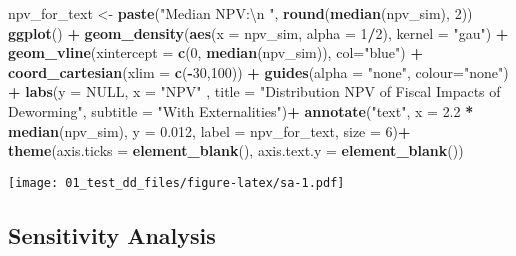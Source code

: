 \documentclass[]{article}
\newenvironment{Shaded}{\begin{snugshade}}{\end{snugshade}}
\newcommand{\CharTok}[1]{\textcolor[rgb]{0.31,0.60,0.02}{#1}}
\newcommand{\DataTypeTok}[1]{\textcolor[rgb]{0.13,0.29,0.53}{#1}}
\newcommand{\DecValTok}[1]{\textcolor[rgb]{0.00,0.00,0.81}{#1}}
\newcommand{\FloatTok}[1]{\textcolor[rgb]{0.00,0.00,0.81}{#1}}
\newcommand{\KeywordTok}[1]{\textcolor[rgb]{0.13,0.29,0.53}{\textbf{#1}}}
\newcommand{\NormalTok}[1]{#1}
\newcommand{\OperatorTok}[1]{\textcolor[rgb]{0.81,0.36,0.00}{\textbf{#1}}}
\newcommand{\OtherTok}[1]{\textcolor[rgb]{0.56,0.35,0.01}{#1}}
\newcommand{\StringTok}[1]{\textcolor[rgb]{0.31,0.60,0.02}{#1}}
\begin{document}
\begin{Shaded}
\begin{Highlighting}[]
\NormalTok{npv_for_text <-}\StringTok{ }\KeywordTok{paste}\NormalTok{(}\StringTok{"Median NPV:}\CharTok{\textbackslash{}n}\StringTok{ "}\NormalTok{, }\KeywordTok{round}\NormalTok{(}\KeywordTok{median}\NormalTok{(npv_sim), }\DecValTok{2}\NormalTok{))}
\KeywordTok{ggplot}\NormalTok{() }\OperatorTok{+}
\StringTok{  }\KeywordTok{geom_density}\NormalTok{(}\KeywordTok{aes}\NormalTok{(}\DataTypeTok{x =}\NormalTok{ npv_sim,}
                   \DataTypeTok{alpha =} \DecValTok{1}\OperatorTok{/}\DecValTok{2}\NormalTok{), }\DataTypeTok{kernel =} \StringTok{"gau"}\NormalTok{) }\OperatorTok{+}
\StringTok{  }\KeywordTok{geom_vline}\NormalTok{(}\DataTypeTok{xintercept =} \KeywordTok{c}\NormalTok{(}\DecValTok{0}\NormalTok{, }\KeywordTok{median}\NormalTok{(npv_sim)), }\DataTypeTok{col=}\StringTok{"blue"}\NormalTok{) }\OperatorTok{+}
\StringTok{  }\KeywordTok{coord_cartesian}\NormalTok{(}\DataTypeTok{xlim =} \KeywordTok{c}\NormalTok{(}\OperatorTok{-}\DecValTok{30}\NormalTok{,}\DecValTok{100}\NormalTok{)) }\OperatorTok{+}
\StringTok{  }\KeywordTok{guides}\NormalTok{(}\DataTypeTok{alpha =} \StringTok{"none"}\NormalTok{, }\DataTypeTok{colour=}\StringTok{"none"}\NormalTok{) }\OperatorTok{+}
\StringTok{  }\KeywordTok{labs}\NormalTok{(}\DataTypeTok{y =} \OtherTok{NULL}\NormalTok{,}
       \DataTypeTok{x =} \StringTok{"NPV"}\NormalTok{ ,}
       \DataTypeTok{title =} \StringTok{"Distribution NPV of Fiscal Impacts of Deworming"}\NormalTok{, }
       \DataTypeTok{subtitle =} \StringTok{"With Externalities"}\NormalTok{)}\OperatorTok{+}
\StringTok{  }\KeywordTok{annotate}\NormalTok{(}\StringTok{"text"}\NormalTok{, }\DataTypeTok{x =} \FloatTok{2.2} \OperatorTok{*}\StringTok{ }\KeywordTok{median}\NormalTok{(npv_sim), }\DataTypeTok{y =} \FloatTok{0.012}\NormalTok{, }\DataTypeTok{label =}\NormalTok{ npv_for_text, }\DataTypeTok{size =} \DecValTok{6}\NormalTok{)}\OperatorTok{+}
\StringTok{  }\KeywordTok{theme}\NormalTok{(}\DataTypeTok{axis.ticks =} \KeywordTok{element_blank}\NormalTok{(), }\DataTypeTok{axis.text.y =} \KeywordTok{element_blank}\NormalTok{())}
\end{Highlighting}
\end{Shaded}

\texttt{[image: 01\_test\_dd\_files/figure-latex/sa-1.pdf]}

\hypertarget{sensitivity-analysis}{%
\subsection{Sensitivity Analysis}\label{sensitivity-analysis}}
\end{document}
